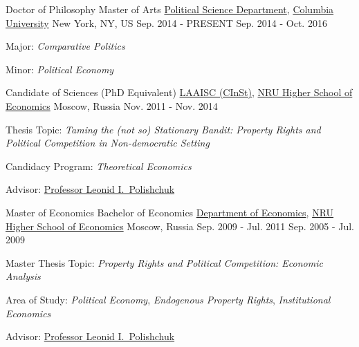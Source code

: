 

\begin{cventries}

\cventry
    {Doctor of Philosophy \newline Master of Arts} %
    {\href{http://polisci.columbia.edu/}{Political Science Department}, \href{http://www.columbia.edu/}{Columbia University}} %
    {New York, NY, US} %
    {Sep. 2014 - PRESENT \newline Sep. 2014 - Oct. 2016} %
    {
      \begin{cvitems} %
        \item {Major: \emph{Comparative Politics}}
        \item {Minor: \emph{Political Economy}}
      \end{cvitems}
    }

\cventry
    {Candidate of Sciences (PhD Equivalent)} %
    {\href{http://isc.hse.ru/about_eng}{LAAISC (CInSt)}, \href{http://www.hse.ru/en/}{NRU Higher School of Economics}} %
    {Moscow, Russia} %
    {Nov. 2011 - Nov. 2014} %
    {
      \begin{cvitems} %
        \item {Thesis Topic: \emph{Taming the (not so) Stationary Bandit: Property Rights and Political Competition in Non-democratic Setting}}
        \item {Candidacy Program: \emph{Theoretical Economics}}
        \item {Advisor: \href{http://www.hse.ru/en/org/persons/65104}{Professor Leonid I.~Polishchuk}}
      \end{cvitems}
    }

\cventry
    {Master of Economics \newline Bachelor of Economics} %
    {\href{http://economics.hse.ru/en/}{Department of Economics}, \href{http://www.hse.ru/en/}{NRU Higher School of Economics}} %
    {Moscow, Russia} %
    {Sep. 2009 - Jul. 2011 \newline Sep. 2005 - Jul. 2009} %
    {
      \begin{cvitems} %
        \item {Master Thesis Topic: \emph{Property Rights and Political Competition: Economic Analysis}}
        \item {Area of Study: \emph{Political Economy}, \emph{Endogenous Property Rights}, \emph{Institutional Economics}}
        \item {Advisor: \href{http://www.hse.ru/en/org/persons/65104}{Professor Leonid I.~Polishchuk}}
      \end{cvitems}
    }


\end{cventries}
